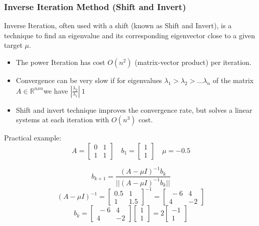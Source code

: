 \documentclass[unicode,11pt,a4paper,oneside,numbers=endperiod,openany]{scrartcl}
\begin{document}
\subsubsection{Inverse Iteration Method (Shift and Invert)}

Inverse Iteration, often used with a shift (known as Shift and Invert), is a technique to find an eigenvalue and its corresponding eigenvector close to a given target \( \mu \).

\begin{itemize}
 \item {The power Iteration has cost $O(n^2)$ (matrix-vector product) per iteration.}
 \item{Convergence can be very slow if for eigenvalues $\lambda_1 > \lambda_2 > ... \lambda_n$ of the matrix $A \in \mathbb{R}^{nxn}$we have $|\frac{\lambda_2}{\lambda_1}| ~ 1$}
 \item{Shift and invert technique improves the convergence rate, but solves a linear systems at each iteration with $O(n^3)$ cost.}
\end{itemize}
Practical example:
\[
 A =
 \begin{bmatrix}
  0 & 1 \\
  1 & 1
 \end{bmatrix}\quad
 b_1 =
 \begin{bmatrix}
  1 \\ 1
 \end{bmatrix}\quad
 \mu = -0.5
\]

\[
 b_{k+1} = \frac{(A-\mu I)^{-1}b_k}{||(A-\mu I)^{-1}b_k||}
\]
\[
 (A-\mu I)^{-1} =
 \begin{bmatrix}
  0.5 & 1 \\
  1 & 1.5
 \end{bmatrix}^{-1}
 = \begin{bmatrix}\
    -6 & 4 \\
    4 & -2
   \end{bmatrix}
   \]
\[
b_k =
   \begin{bmatrix}\
    -6 & 4 \\
    4 & -2
   \end{bmatrix}
   \begin{bmatrix}
    1\\1
   \end{bmatrix} = 2
   \begin{bmatrix}
    -1 \\ 1
   \end{bmatrix}
\]
\end{document}
